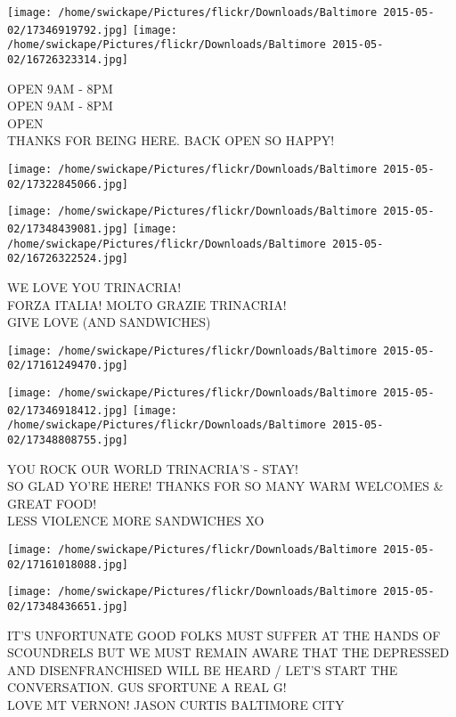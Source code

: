 \documentclass[10pt,letterpaper]{article}
\begin{document}
\texttt{[image: /home/swickape/Pictures/flickr/Downloads/Baltimore 2015-05-02/17346919792.jpg]}
\texttt{[image: /home/swickape/Pictures/flickr/Downloads/Baltimore 2015-05-02/16726323314.jpg]}

OPEN 9AM {-} 8PM\\
OPEN 9AM {-} 8PM\\
OPEN\\
THANKS FOR BEING HERE.  BACK OPEN SO HAPPY!\\
\pagebreak

\texttt{[image: /home/swickape/Pictures/flickr/Downloads/Baltimore 2015-05-02/17322845066.jpg]}

\vspace{0.25in}
\texttt{[image: /home/swickape/Pictures/flickr/Downloads/Baltimore 2015-05-02/17348439081.jpg]}
\texttt{[image: /home/swickape/Pictures/flickr/Downloads/Baltimore 2015-05-02/16726322524.jpg]}

WE LOVE YOU TRINACRIA!\\
FORZA ITALIA!  MOLTO GRAZIE TRINACRIA!\\
GIVE LOVE (AND SANDWICHES)\\
\pagebreak

\texttt{[image: /home/swickape/Pictures/flickr/Downloads/Baltimore 2015-05-02/17161249470.jpg]}

\vspace{0.25in}
\texttt{[image: /home/swickape/Pictures/flickr/Downloads/Baltimore 2015-05-02/17346918412.jpg]}
\texttt{[image: /home/swickape/Pictures/flickr/Downloads/Baltimore 2015-05-02/17348808755.jpg]}

YOU ROCK OUR WORLD TRINACRIA'S {-} STAY!\\
SO GLAD YO'RE HERE!  THANKS FOR SO MANY WARM WELCOMES \& GREAT FOOD!\\
LESS VIOLENCE MORE SANDWICHES XO\\
\pagebreak

\texttt{[image: /home/swickape/Pictures/flickr/Downloads/Baltimore 2015-05-02/17161018088.jpg]}

\vspace{0.25in}
\texttt{[image: /home/swickape/Pictures/flickr/Downloads/Baltimore 2015-05-02/17348436651.jpg]}

IT'S UNFORTUNATE GOOD FOLKS MUST SUFFER AT THE HANDS OF SCOUNDRELS BUT WE MUST REMAIN AWARE THAT THE DEPRESSED AND DISENFRANCHISED WILL BE HEARD / LET'S START THE CONVERSATION.  GUS SFORTUNE A REAL G!\\
LOVE MT VERNON!  JASON CURTIS BALTIMORE CITY\\
\pagebreak
\end{document}
